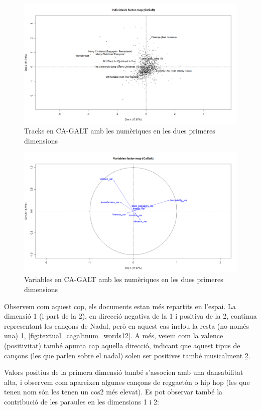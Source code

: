 \begin{figure}[H]
    \centering
    \includegraphics[width=0.7\linewidth]{Images//8_Textual//Analysis/cagalt_tracks_12.png}
    \caption{Tracks en CA-GALT amb les numèriques en les dues primeres dimensions}
    \label{fig:textual_cagaltnum_tracks12}
\end{figure}

\begin{figure}[H]
    \centering
    \includegraphics[width=0.7\linewidth]{Images//8_Textual//Analysis/cagalt_quanti_12.png}
    \caption{Variables en CA-GALT amb les numèriques en les dues primeres dimensions}
    \label{fig:textual_cagalnum_vars12}
\end{figure}

Observem com aquest cop, els documents estan més repartits en l'espai. La dimensió 1 (i part de la 2), en direcció negativa de la 1 i positiva de la 2, continua representant les cançons de Nadal, però en aquest cas inclou la resta (no només una) \ref{fig:textual_cagaltnum_tracks12}, \ref{fig:textual_cagaltnum_words12}. A més, veiem com la valence (positivitat) també apunta cap aquella direcció, indicant que aquest tipus de cançons (les que parlen sobre el nadal) solen ser positives també musicalment \ref{fig:textual_cagalnum_vars12}.

Valors positius de la primera dimensió també s'associen amb una dansabilitat alta, i observem com apareixen algunes cançons de reggaetón o hip hop (les que tenen nom són les tenen un cos2 més elevat). Es pot observar també la contribució de les paraules en les dimensions 1 i 2:


